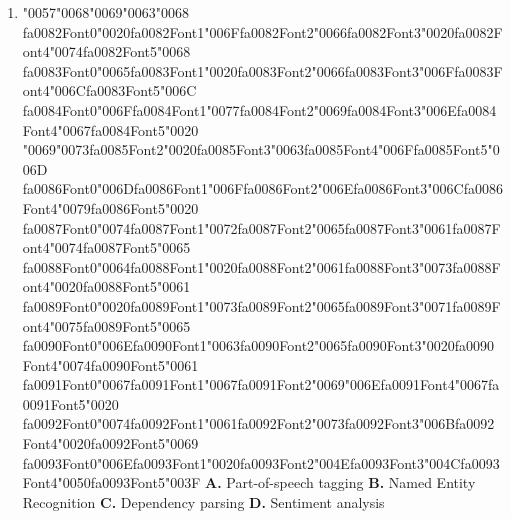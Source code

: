 \documentclass[11pt]{article}
\begin{document}
\begin{enumerate}[leftmargin=*]
  \item {\char"0057}{\char"0068}{\char"0069}{\char"0063}{\char"0068} {\csname fa0082Font0\endcsname\char"0020}{\csname fa0082Font1\endcsname\char"006F}{\csname fa0082Font2\endcsname\char"0066}{\csname fa0082Font3\endcsname\char"0020}{\csname fa0082Font4\endcsname\char"0074}{\csname fa0082Font5\endcsname\char"0068} {\csname fa0083Font0\endcsname\char"0065}{\csname fa0083Font1\endcsname\char"0020}{\csname fa0083Font2\endcsname\char"0066}{\csname fa0083Font3\endcsname\char"006F}{\csname fa0083Font4\endcsname\char"006C}{\csname fa0083Font5\endcsname\char"006C} {\csname fa0084Font0\endcsname\char"006F}{\csname fa0084Font1\endcsname\char"0077}{\csname fa0084Font2\endcsname\char"0069}{\csname fa0084Font3\endcsname\char"006E}{\csname fa0084Font4\endcsname\char"0067}{\csname fa0084Font5\endcsname\char"0020} {\char"0069}{\char"0073}{\csname fa0085Font2\endcsname\char"0020}{\csname fa0085Font3\endcsname\char"0063}{\csname fa0085Font4\endcsname\char"006F}{\csname fa0085Font5\endcsname\char"006D} {\csname fa0086Font0\endcsname\char"006D}{\csname fa0086Font1\endcsname\char"006F}{\csname fa0086Font2\endcsname\char"006E}{\csname fa0086Font3\endcsname\char"006C}{\csname fa0086Font4\endcsname\char"0079}{\csname fa0086Font5\endcsname\char"0020} {\csname fa0087Font0\endcsname\char"0074}{\csname fa0087Font1\endcsname\char"0072}{\csname fa0087Font2\endcsname\char"0065}{\csname fa0087Font3\endcsname\char"0061}{\csname fa0087Font4\endcsname\char"0074}{\csname fa0087Font5\endcsname\char"0065} {\csname fa0088Font0\endcsname\char"0064}{\csname fa0088Font1\endcsname\char"0020}{\csname fa0088Font2\endcsname\char"0061}{\csname fa0088Font3\endcsname\char"0073}{\csname fa0088Font4\endcsname\char"0020}{\csname fa0088Font5\endcsname\char"0061} {\csname fa0089Font0\endcsname\char"0020}{\csname fa0089Font1\endcsname\char"0073}{\csname fa0089Font2\endcsname\char"0065}{\csname fa0089Font3\endcsname\char"0071}{\csname fa0089Font4\endcsname\char"0075}{\csname fa0089Font5\endcsname\char"0065} {\csname fa0090Font0\endcsname\char"006E}{\csname fa0090Font1\endcsname\char"0063}{\csname fa0090Font2\endcsname\char"0065}{\csname fa0090Font3\endcsname\char"0020}{\csname fa0090Font4\endcsname\char"0074}{\csname fa0090Font5\endcsname\char"0061} {\csname fa0091Font0\endcsname\char"0067}{\csname fa0091Font1\endcsname\char"0067}{\csname fa0091Font2\endcsname\char"0069}{\char"006E}{\csname fa0091Font4\endcsname\char"0067}{\csname fa0091Font5\endcsname\char"0020} {\csname fa0092Font0\endcsname\char"0074}{\csname fa0092Font1\endcsname\char"0061}{\csname fa0092Font2\endcsname\char"0073}{\csname fa0092Font3\endcsname\char"006B}{\csname fa0092Font4\endcsname\char"0020}{\csname fa0092Font5\endcsname\char"0069} {\csname fa0093Font0\endcsname\char"006E}{\csname fa0093Font1\endcsname\char"0020}{\csname fa0093Font2\endcsname\char"004E}{\csname fa0093Font3\endcsname\char"004C}{\csname fa0093Font4\endcsname\char"0050}{\csname fa0093Font5\endcsname\char"003F}
    \textbf{A.} Part-of-speech tagging
    \textbf{B.} Named Entity Recognition
    \textbf{C.} Dependency parsing
    \textbf{D.} Sentiment analysis


\end{enumerate}
\end{document}
